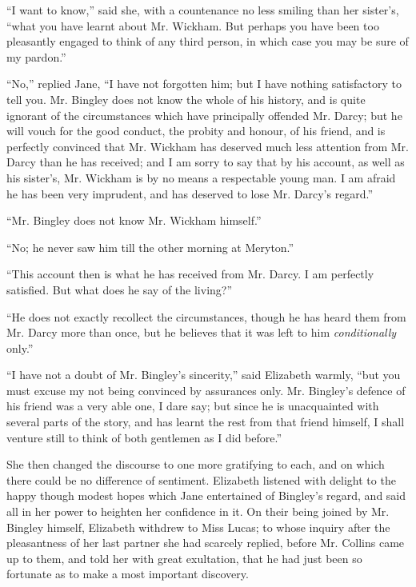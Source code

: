 ``I want to know,'' said she, with a countenance no less smiling than her sister's, ``what you have learnt about Mr. Wickham. But perhaps you have been too pleasantly engaged to think of any third person, in which case you may be sure of my pardon.''

``No,'' replied Jane, ``I have not forgotten him; but I have nothing satisfactory to tell you. Mr. Bingley does not know the whole of his history, and is quite ignorant of the circumstances which have principally offended Mr. Darcy; but he will vouch for the good conduct, the probity and honour, of his friend, and is perfectly convinced that Mr. Wickham has deserved much less attention from Mr. Darcy than he has received; and I am sorry to say that by his account, as well as his sister's, Mr. Wickham is by no means a respectable young man. I am afraid he has been very imprudent, and has deserved to lose Mr. Darcy's regard.''

``Mr. Bingley does not know Mr. Wickham himself.''

``No; he never saw him till the other morning at Meryton.''

``This account then is what he has received from Mr. Darcy. I am perfectly satisfied. But what does he say of the living?''

``He does not exactly recollect the circumstances, though he has heard them from Mr. Darcy more than once, but he believes that it was left to him \textit{conditionally} only.''

``I have not a doubt of Mr. Bingley's sincerity,'' said Elizabeth warmly, ``but you must excuse my not being convinced by assurances only. Mr. Bingley's defence of his friend was a very able one, I dare say; but since he is unacquainted with several parts of the story, and has learnt the rest from that friend himself, I shall venture still to think of both gentlemen as I did before.''

She then changed the discourse to one more gratifying to each, and on which there could be no difference of sentiment. Elizabeth listened with delight to the happy though modest hopes which Jane entertained of Bingley's regard, and said all in her power to heighten her confidence in it. On their being joined by Mr. Bingley himself, Elizabeth withdrew to Miss Lucas; to whose inquiry after the pleasantness of her last partner she had scarcely replied, before Mr. Collins came up to them, and told her with great exultation, that he had just been so fortunate as to make a most important discovery.

